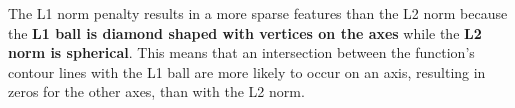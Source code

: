 The L1 norm penalty results in a more sparse features than the L2 norm because the {\bf L1 ball is diamond shaped with vertices on the axes} while the {\bf L2 norm is spherical}. This means that an intersection between the function's contour lines with the L1 ball are more likely to occur on an axis, resulting in zeros for the other axes, than with the L2 norm.

